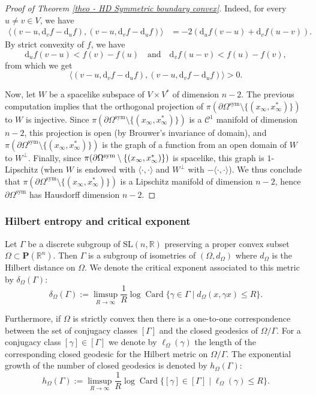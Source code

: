 \documentclass[11pt]{article}
\numberwithin{equation}{section}
\newcommand{\quand}{\quad\text{and}\quad}
\newcommand{\sym}{\mathrm{sym}}
\theoremstyle{definition}
\newcommand{\proj}{\mathbf{P}}
\newcommand{\R}{\mathbb{R}}
\newcommand{\SL}{\mathrm{SL}}
\DeclareMathOperator{\Card}{Card}
\let\G\Gamma
\let\g\gamma
\begin{document}
\begin{proof}[Proof of Theorem \ref{theo - HD Symmetric boundary convex}]
Indeed, for every $u\neq v \in V$, we have
\begin{align*}
\bigl\langle (v-u, \mathrm d_v f - \mathrm d_u f), (v-u, \mathrm d_v f - \mathrm d_u f)\bigr\rangle &= -2(\mathrm d_u f(v-u) + \mathrm d_v f(u-v)).
\end{align*}
By strict convexity of $f$, we have
\[\mathrm d_u f(v-u) < f(v) - f(u)\quand \mathrm d_v f(u-v) < f(u) - f(v),\]
from which we get
\[\bigl\langle (v-u, \mathrm d_v f - \mathrm d_u f), (v-u, \mathrm d_v f - \mathrm d_u f)\bigr\rangle > 0.\]

Now, let $W$ be a spacelike subspace of $V\times V^*$ of dimension $n-2$. The previous computation implies that the orthogonal projection of $\pi(\partial \Omega^{\sym} \setminus \{(x_\infty, x_\infty^*)\})$ to $W$ is injective. Since $\pi(\partial \Omega^{\sym} \setminus \{(x_\infty, x_\infty^*)\})$ is a $\mathcal C^1$ manifold of dimension $n-2$, this projection is open (by Brouwer's invariance of domain), and $\pi(\partial \Omega^{\sym} \setminus \{(x_\infty, x_\infty^*)\})$ is the graph of a function from an open domain of $W$ to $W^\perp$. Finally, since $\pi(\partial \Omega^{\sym} \setminus\nobreak \{(x_\infty, x_\infty^*)\})$ is spacelike, this graph is $1$-Lipschitz (when $W$ is endowed with $\langle \cdot , \cdot \rangle$ and $W^\perp$ with $-\langle \cdot , \cdot \rangle$). We thus conclude that $\pi(\partial \Omega^{\sym} \setminus \{(x_\infty, x_\infty^*)\})$ is a Lipschitz manifold of dimension $n-2$, hence $\partial \Omega^{\sym}$ has Hausdorff dimension $n-2$.
\end{proof}

\subsubsection{Hilbert entropy and critical exponent}

Let $\G$ be a discrete subgroup of $\SL(n,\R)$ preserving a proper convex subset $\Omega\subset \proj(\R^n)$. Then $\G$ is a subgroup of isometries of $(\Omega,d_\Omega)$ where $d_\Omega$ is the Hilbert distance on $\Omega$. We denote the critical exponent associated to this metric by $\delta_\Omega(\G)$:
\[\delta_\Omega(\G):= \limsup_{R\to \infty} \frac{1}{R} \log \Card \{ \g \in \G \mid d_\Omega(x,\g x) \leq R\}.\]

Furthermore, if $\Omega$ is strictly convex then there is a one-to-one correspondence \hbox{between} the set of conjugacy classes $ [\G]$ and the closed geodesics of $\Omega/\G$. For a conjugacy class $[\g]\in[\G] $ we denote by $\ell_\Omega(\g)$ the length of the corresponding closed geodesic for the Hilbert metric on $\Omega/\G$. The exponential growth of the number of closed geodesics is denoted by $h_\Omega(\G)$:
\[h_\Omega(\G) := \limsup_{R\to \infty} \frac{1}{R} \log \Card \{ [\g] \in [\G] \mid \ell_\Omega(\g)\leq R\}.\]
\end{document}
